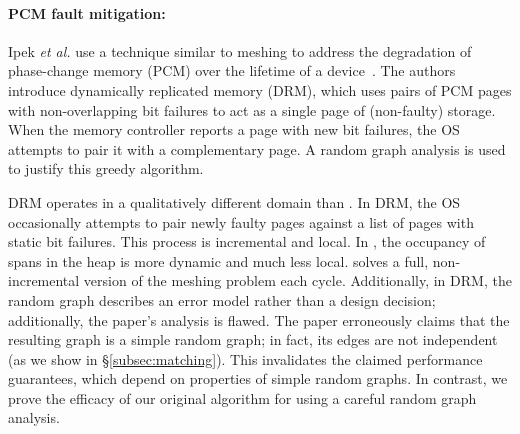 
\paragraph{PCM fault mitigation:}
Ipek \emph{et al.} use a technique similar to meshing to address the
degradation of phase-change memory (PCM) over the lifetime of a
device~\cite{ipek:2010:dynamic-replication}.  The authors introduce
dynamically replicated memory (DRM), which uses pairs of PCM pages
with non-overlapping bit failures to act as a single page of
(non-faulty) storage.  When the memory controller reports a page with
new bit failures, the OS attempts to pair it with a complementary
page. A random graph analysis is used to justify this greedy
algorithm.

DRM operates in a qualitatively different domain than \Mesh.  In DRM,
the OS occasionally attempts to pair newly faulty pages
against a list of pages with static bit failures.  This process is
incremental and local.  In \Mesh, the occupancy of spans in the heap
is more dynamic and much less local. \Mesh solves a full,
non-incremental version of the meshing problem each cycle.
Additionally, in DRM, the random graph describes an error model rather
than a design decision; additionally, the paper's analysis is flawed.
The paper erroneously claims that the resulting graph is a simple
random graph; in fact, its edges are not independent (as we show in
\S\ref{subsec:matching}).  This invalidates the claimed performance
guarantees, which depend on properties of simple random graphs. In
contrast, we prove the efficacy of our original \sm algorithm for
\Mesh using a careful random graph analysis.

\begin{comment}
  To avoid catastrophic memory consumption,
Hound employs virtual compaction, a non-randomized, best-effort form
of meshing. Their approach depends on heuristics and does not employ
randomization or come with any guarantees of fragmentation
recovery.
  Hound is not intended to be
space-efficient (and it is not) but rather to find leaks. Hound
identifies leaks by segregating objects by allocation site, protects
``cold'' pages, and delays reuse of pages until every object on that
page has been freed.
\end{comment}

